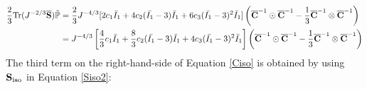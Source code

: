\begin{equation} \label{part22}
\begin{split}
\frac{2}{3}\mathrm{Tr}(J^{-2/3}\overline{\bold{S}}) \tilde{\mathbb{P}}
= {} & 
\frac{2}{3}J^{-4/3} [2c_1\bar{I}_1 + 4c_2(\bar{I_1} - 3)\bar{I}_1 + 6c_3(\bar{I_1} - 3)^2\bar{I}_1] \left({\overline{\bold{C}}}^{-1} \odot {\overline{\bold{C}}}^{-1} - \frac{1}{3}{\overline{\bold{C}}}^{-1} \otimes {\overline{\bold{C}}}^{-1} \right) \\
= {} &
J^{-4/3} \left[\frac{4}{3}c_1\bar{I}_1 + \frac{8}{3}c_2(\bar{I_1} - 3)\bar{I}_1 + 4c_3(\bar{I_1} - 3)^2\bar{I}_1\right] \left({\overline{\bold{C}}}^{-1} \odot {\overline{\bold{C}}}^{-1} - \frac{1}{3}{\overline{\bold{C}}}^{-1} \otimes {\overline{\bold{C}}}^{-1} \right) 
\end{split}
\end{equation}
The third term on the right-hand-side of Equation \ref{Ciso} is obtained by using $\bold{S}_\mathrm{iso}$ in Equation \ref{Siso2}:

